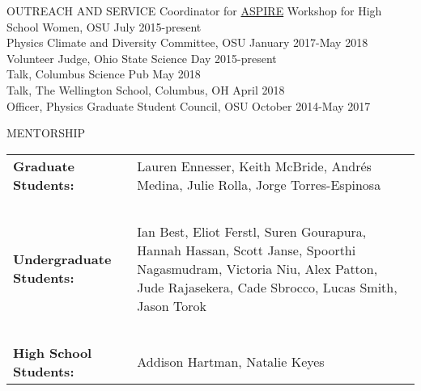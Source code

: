 \documentclass{resume} %
\begin{document}
\begin{rSection}{OUTREACH AND SERVICE}
Coordinator for \href{u.osu.edu/aspire}{ASPIRE} Workshop for High School Women, OSU \hfill July 2015-present\\
Physics Climate and Diversity Committee, OSU \hfill January 2017-May 2018\\
Volunteer Judge, Ohio State Science Day \hfill 2015-present\\
Talk, Columbus Science Pub \hfill  May 2018\\
Talk, The Wellington School, Columbus, OH \hfill April 2018\\
Officer, Physics Graduate Student Council, OSU \hfill October 2014-May 2017 \\
\end{rSection}
\vspace{-0.30cm}

\newpage
\begin{rSection}{MENTORSHIP}
\begin{table}[h]
\begin{tabularx}{\textwidth}{l X}
 {\bf Graduate Students:}  & Lauren Ennesser, Keith McBride, Andr\'es Medina, Julie Rolla,  \hspace{1cm} Jorge Torres-Espinosa \\
 ~ & ~ \\
{\bf Undergraduate Students:}  & Ian Best, Eliot Ferstl, Suren Gourapura, Hannah Hassan, Scott Janse, Spoorthi Nagasmudram, Victoria Niu, Alex Patton, Jude Rajasekera, Cade Sbrocco, Lucas Smith, Jason Torok \\
~ & ~ \\
{\bf High School Students:} &  Addison Hartman, Natalie Keyes\\
\end{tabularx}
\end{table}
\end{rSection}
\end{document}
